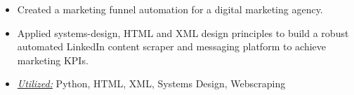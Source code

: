 \documentclass[10pt,a4paper,ragged2e]{altacv}
\begin{document}
\begin{itemize}
  \item Created a marketing funnel automation for a digital marketing agency.
  \item Applied systems-design, HTML and XML design principles to build a robust automated LinkedIn content scraper and messaging platform to achieve marketing KPIs.
  \item \underline{\textit{Utilized:}} Python, HTML, XML, Systems Design, Webscraping
\end{itemize}


\clearpage
\nocite{*}
\end{document}
